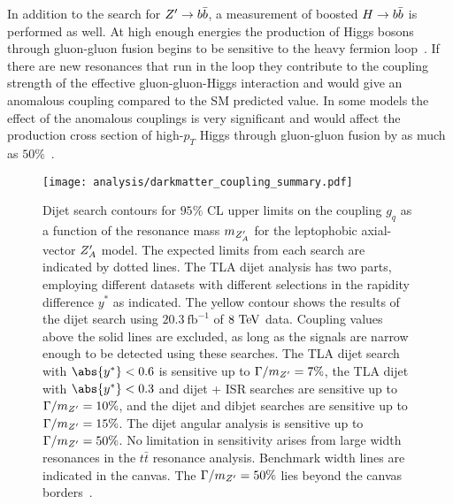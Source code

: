 In addition to the search for $Z' \to b\bar{b}$, a measurement of boosted $H \to b\bar{b}$ is performed as well.
At high enough energies the production of Higgs bosons through gluon-gluon fusion begins to be sensitive to the heavy fermion loop~\cite{Schlaffer:2014osa}.
If there are new resonances that run in the loop they contribute to the coupling strength of the effective gluon-gluon-Higgs interaction and would give an anomalous coupling compared to the SM predicted value.
In some models the effect of the anomalous couplings is very significant and would affect the production cross section of high-$p_{T}$ Higgs through gluon-gluon fusion by as much as $50\%$~\cite{Grojean:2013nya,Dawson:2015gka}.

\begin{figure}[htbp]
 \centering
 \texttt{[image: analysis/darkmatter\_coupling\_summary.pdf]}
 \caption[Dijet search contours for $95\%$ CL upper limits on the coupling $g_{q}$ for the leptophobic axial-vector $\Zprime_{A}$ model.]{%
 Dijet search contours for $95\%$ CL upper limits on the coupling $g_{q}$ as a function of the resonance mass $m_{Z'_{A}}$ for the leptophobic axial-vector $\Zprime_{A}$ model.
 The expected limits from each search are indicated by dotted lines.
 The TLA dijet analysis has two parts, employing different datasets with different selections in the rapidity difference $y^{*}$ as indicated.
 The yellow contour shows the results of the dijet search using $20.3~\mathrm{fb}^{-1}$ of $8~\mathrm{TeV}$ data.
 Coupling values above the solid lines are excluded, as long as the signals are narrow enough to be detected using these searches.
 The TLA dijet search with $\abs{y^{*}} < 0.6$ is sensitive up to $\Gamma/m_{Z'} = 7\%$, the TLA dijet with $\abs{y^{*}} < 0.3$ and dijet + ISR searches are sensitive up to $\Gamma/m_{Z'} = 10\%$, and the dijet and dibjet searches are sensitive up to $\Gamma/m_{Z'} = 15\%$.
 The dijet angular analysis is sensitive up to $\Gamma/m_{Z'} = 50\%$.
 No limitation in sensitivity arises from large width resonances in the $t\bar{t}$ resonance analysis.
 Benchmark width lines are indicated in the canvas.
 The $\Gamma/m_{Z'} = 50\%$ lies beyond the canvas borders~\cite{EXOT-2017-32}.}
 \label{fig:darkmatter_coupling_summary}
\end{figure}

